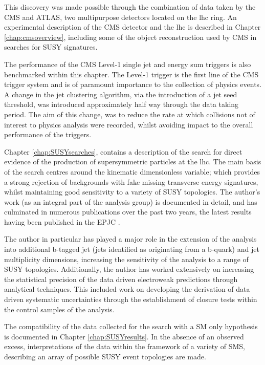 This discovery was made possible through the combination of data taken by the \acf{CMS} and \ac{ATLAS}, two multipurpose detectors located on the \ac{lhc} ring. An experimental description of the \ac{CMS} detector and the \ac{lhc} is described in Chapter \ref{chap:cmsoverview}, including some of the object reconstruction used by \ac{CMS} in searches for \ac{SUSY} signatures. 

The performance of the \ac{CMS} Level-1 single jet and energy sum triggers is also benchmarked within this chapter. The Level-1 trigger is the first line of the \ac{CMS} trigger system and is of paramount importance to the collection of physics events. A change in the jet clustering algorithm, via the introduction of a jet seed threshold, was introduced approximately half way through the data taking period. The aim of this change, was to reduce the rate at which collisions not of interest to physics analysis were recorded, whilst avoiding impact to the overall performance of the triggers.

Chapter \ref{chap:SUSYsearches}, contains a description of the search for direct evidence of the production of supersymmetric particles at the \ac{lhc}. The main basis of the search centres around the kinematic dimensionless \alphat variable; which provides a strong rejection of backgrounds with fake missing transverse energy signatures, whilst maintaining good sensitivity to a variety of \ac{SUSY} topologies. The author's work (as an integral part of the analysis group) is documented in detail, and has culminated in numerous publications over the past two years, the latest results having been published in the \acf{EPJC} \cite{ra1_epjc}. 

The author in particular has played a major role in the extension of the \alphat analysis into additional b-tagged jet (jets identified as originating from a b-quark) and jet multiplicity dimensions, increasing the sensitivity of the analysis to a range of \ac{SUSY} topologies. Additionally, the author has worked extensively on increasing the statistical precision of the data driven electroweak predictions through analytical techniques. This included work on developing the derivation of data driven systematic uncertainties through the establishment of closure tests within the control samples of the analysis. 

The compatibility of the data collected for the \alphat search with a \ac{SM} only hypothesis is documented in Chapter \ref{chap:SUSYresults}. In the absence of an observed excess, interpretations of the data within the framework of a variety of \acf{SMS}, describing an array of possible \ac{SUSY} event topologies are made.

